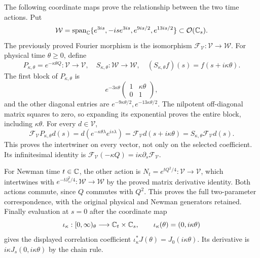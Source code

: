 The following coordinate maps prove the relationship between the two
time actions. Put
\[
\mathcal W=\operatorname{span}_{\mathbb C}
\{e^{3is},-is e^{3is},e^{9is/2},e^{13is/2}\}\subset\mathcal O(\mathbb C_s).
\]
The previously proved Fourier morphism is the isomorphism
$\mathcal F_{\mathcal V}:\mathcal V\to\mathcal W$.
For physical time $\theta\ge0$, define
\[
P_{\kappa,\theta}=e^{-\kappa\theta Q}:\mathcal V\to\mathcal V,
\quad S_{\kappa,\theta}:\mathcal W\to\mathcal W,
\quad (S_{\kappa,\theta}f)(s)=f(s+i\kappa\theta).
\]
The first block of $P_{\kappa,\theta}$ is
\[
e^{-3\kappa\theta}
\begin{pmatrix}1&\kappa\theta\\0&1\end{pmatrix},
\]
and the other diagonal entries are
$e^{-9\kappa\theta/2},e^{-13\kappa\theta/2}$.
The nilpotent off-diagonal matrix squares to zero, so expanding its
exponential proves the entire block, including $\kappa\theta$.
For every $d\in\mathcal V$,
\[
\mathcal F_{\mathcal V}P_{\kappa,\theta}d(s)
=d(e^{-\kappa\theta\lambda}e^{is\lambda})
=\mathcal F_{\mathcal V}d(s+i\kappa\theta)
=S_{\kappa,\theta}\mathcal F_{\mathcal V}d(s).
\]
This proves the intertwiner on every vector, not only on the selected
coefficient. Its infinitesimal identity is
$\mathcal F_{\mathcal V}(-\kappa Q)=i\kappa\partial_s\mathcal F_{\mathcal V}$.

For Newman time $t\in\mathbb C$, the other action is
$N_t=e^{tQ^2/4}:\mathcal V\to\mathcal V$, which intertwines with
$e^{-t\partial_s^2/4}:\mathcal W\to\mathcal W$ by the proved
matrix derivative identity. Both actions commute, since $Q$ commutes
with $Q^2$. This proves the full two-parameter correspondence, with
the original physical and Newman generators retained.
Finally evaluation at $s=0$ after the coordinate map
\[
\iota_\kappa:[0,\infty)_\theta\longrightarrow\mathbb C_t\times\mathbb C_s,
\qquad \iota_\kappa(\theta)=(0,i\kappa\theta)
\]
gives the displayed correlation coefficient
$\iota_\kappa^*J(\theta)=J_0(i\kappa\theta)$.
Its derivative is $i\kappa J_s(0,i\kappa\theta)$ by the chain rule.

